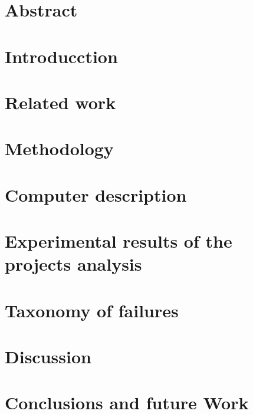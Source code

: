 \documentclass[11pt,a4paper,twoside]{book}
\begin{document}
\frontmatter





\chapter{Abstract}




\mainmatter
\restauraCabecera

\chapter{Introducction}
\label{sec:intro} 
 

\chapter{Related work}
\label{sec:related}


\chapter{Methodology}
\label{sec:metodology}


\chapter{Computer description}
\label{sec:compdesc}


\chapter{Experimental results of the projects analysis}
\label{sec:results}


\chapter{Taxonomy of failures}
\label{sec:taxonomy}


\chapter{Discussion}
\label{sec:discussion}


\chapter{Conclusions and future Work}
\label{sec:conclusions}


%
%
%

\backmatter

%
%

%




%
%

\end{document}
